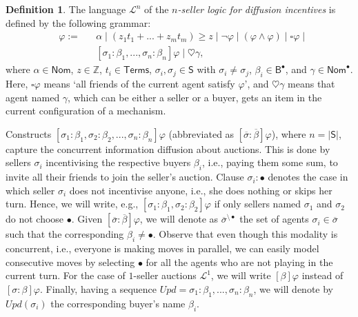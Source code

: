 \documentclass[letterpaper]{article} %
\theoremstyle{definition}
\newtheorem{definition}{Definition}
\newcommand{\Upd}{\mathit{Upd}}
\begin{document}
\begin{definition}
The language $\mathcal{L}^n$ of the \emph{$n$-seller logic for diffusion incentives} is defined by the following grammar:
    \begin{align*}
    &\varphi:= &&\alpha\mid %
    (z_1 t_1 + ...+z_m t_m) \geqslant z  \mid \lnot \varphi  \mid (\varphi \land \varphi) %
    \mid \square\varphi \mid \\ 
   & &&[\sigma_1: \beta_1, ..., \sigma_n: \beta_n] \varphi \mid \heartsuit\gamma,
\end{align*}
where $\alpha \in \mathsf{Nom}$, $z \in \mathbb{Z}$,
$t_i \in \mathsf{Terms}$,
$\sigma_i,\sigma_j \in \mathsf{S}$ with $\sigma_i \neq \sigma_j$, $\beta_i \in \mathsf{B}^\bullet$, and $\gamma \in \mathsf{Nom}^\bullet$. Here, $\square \varphi$ means `all friends of the current agent satisfy $\varphi$', and $\heartsuit \gamma$ means that agent named $\gamma$, which can be either a seller or a buyer, gets an item in the current configuration of a mechanism. 

Constructs $[\sigma_1: \beta_1, \sigma_2:\beta_2, ..., \sigma_n: \beta_n] \varphi$ (abbreviated as $[\overline{\sigma}:\overline{\beta}]\varphi$), where $n = |\mathsf{S}|$, capture the concurrent information diffusion about auctions. This is done by sellers $\sigma_i$ incentivising the respective buyers $\beta_i$, i.e., paying them some sum, to invite all their friends to join the seller's auction. %
Clause $\sigma_i: \bullet$ denotes the case in which seller $\sigma_i$ does not incentivise anyone, i.e., she does nothing or skips her turn.
Hence, we will write, e.g., $[\sigma_1: \beta_1, \sigma_2:\beta_2]\varphi$ if only sellers named $\sigma_1$ and $\sigma_2$ do not choose $\bullet$. Given $[\overline{\sigma}:\overline{\beta}]\varphi$, we will denote as $\overline{\sigma}^{\setminus \bullet}$ the set of agents $\sigma_i \in \overline{\sigma}$ such that the corresponding $\beta_i \neq \bullet$. Observe that even though this modality is concurrent, i.e., everyone is making moves in parallel, we can easily model consecutive moves by selecting $\bullet$ for all the agents who are not playing in the current turn. For the case of $1$-seller auctions $\mathcal{L}^1$, we will write $[\beta]\varphi$ instead of $[\sigma:\beta] \varphi$. Finally, having a sequence $\Upd = \sigma_1: \beta_1, ..., \sigma_n: \beta_n$, we will denote by $\Upd(\sigma_i)$ the corresponding buyer's name $\beta_i$.


\end{definition}
\end{document}
